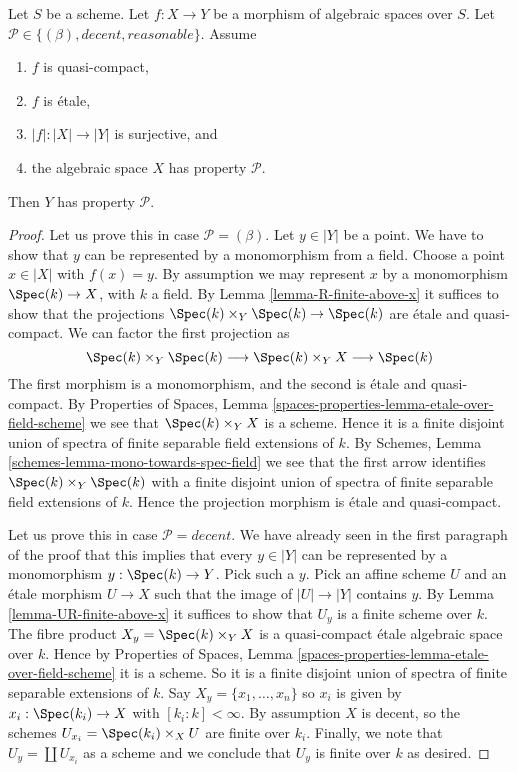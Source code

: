 \begin{lemma}
\label{lemma-descent-conditions}
Let $S$ be a scheme.
Let $f : X \to Y$ be a morphism of algebraic spaces over $S$.
Let $\mathcal{P} \in \{(\beta), decent, reasonable\}$.
Assume
\begin{enumerate}
\item $f$ is quasi-compact,
\item $f$ is \'etale,
\item $|f| : |X| \to |Y|$ is surjective, and
\item the algebraic space $X$ has property $\mathcal{P}$.
\end{enumerate}
Then $Y$ has property $\mathcal{P}$.
\end{lemma}

\begin{proof}
Let us prove this in case $\mathcal{P} = (\beta)$. Let $y \in |Y|$ be
a point. We have to show that $y$ can be represented by a monomorphism
from a field. Choose a point $x \in |X|$ with $f(x) = y$.
By assumption we may represent $x$ by a monomorphism
$\Spec(k) \to X$, with $k$ a field. By
Lemma \ref{lemma-R-finite-above-x}
it suffices to show that the projections
$\Spec(k) \times_Y \Spec(k) \to \Spec(k)$
are \'etale and quasi-compact. We can factor the first projection as
$$
\Spec(k) \times_Y \Spec(k)
\longrightarrow
\Spec(k) \times_Y X
\longrightarrow
\Spec(k)
$$
The first morphism is a monomorphism, and the second is \'etale and
quasi-compact. By
Properties of Spaces,
Lemma \ref{spaces-properties-lemma-etale-over-field-scheme}
we see that $\Spec(k) \times_Y X$ is a scheme. Hence it is a
finite disjoint union of spectra of finite separable field extensions
of $k$. By
Schemes, Lemma \ref{schemes-lemma-mono-towards-spec-field}
we see that the first arrow identifies
$\Spec(k) \times_Y \Spec(k)$ with a finite disjoint
union of spectra of finite separable field extensions of $k$.
Hence the projection morphism is \'etale and quasi-compact.

\medskip\noindent
Let us prove this in case $\mathcal{P} = decent$.
We have already seen in the first paragraph of the proof that this implies
that every $y \in |Y|$ can be represented by a monomorphism
$y : \Spec(k) \to Y$. Pick such a $y$. Pick an affine
scheme $U$ and an \'etale morphism $U \to X$ such that the image
of $|U| \to |Y|$ contains $y$. By
Lemma \ref{lemma-UR-finite-above-x}
it suffices to show that $U_y$ is a finite scheme over $k$. The fibre
product $X_y = \Spec(k) \times_Y X$ is a quasi-compact \'etale
algebraic space over $k$. Hence by
Properties of Spaces,
Lemma \ref{spaces-properties-lemma-etale-over-field-scheme}
it is a scheme. So it is a finite disjoint union of spectra of
finite separable extensions of $k$. Say $X_y = \{x_1, \ldots, x_n\}$
so $x_i$ is given by  $x_i : \Spec(k_i) \to X$ with
$[k_i : k] < \infty$. By assumption $X$ is decent, so the schemes
$U_{x_i} = \Spec(k_i) \times_X U$ are finite over $k_i$.
Finally, we note that $U_y = \coprod U_{x_i}$ as a scheme and we conclude
that $U_y$ is finite over $k$ as desired.


\end{proof}
